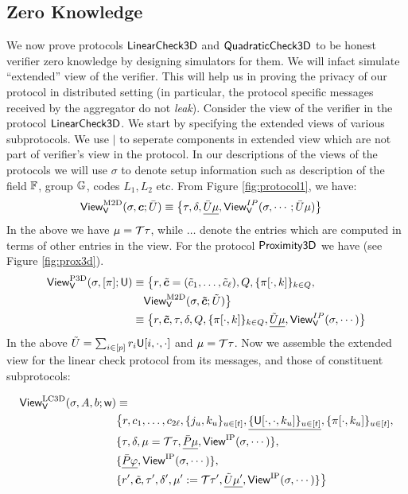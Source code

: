 \subsection{Zero Knowledge}
We now prove protocols $\mathsf{LinearCheck3D}$ and $\mathsf{QuadraticCheck3D}$ to be honest verifier zero knowledge by
designing simulators for them. We will infact simulate ``extended'' view of the
verifier. This will help us in proving the privacy of our protocol in
distributed setting (in particular, the protocol specific messages received by
the aggregator do not {\em leak}). Consider the view of the verifier in the
protocol $\mathsf{LinearCheck3D}$. We start by specifying the extended views of various
subprotocols. We use $\vert$ to seperate components in extended view which are
not part of verifier's view in the protocol. In our descriptions of the views of
the protocols we will use $\sigma$ to denote setup information such as
description of the field $\mathbb{F}$, group $\mathbb{G}$, codes $L_1,L_2$ etc. From Figure
\ref{fig:protocol1}, we have:
\begin{align}
\mathsf{View}^{\rm M2D}_{\mathsf{V}}(\sigma,\bm{c};\bar{U}) &\equiv
	\big\{\tau,\delta,\underline{\bar{U}\mu},\mathsf{View}^{IP}_{\mathsf{V}}(\sigma,\cdots;\bar{U}\mu)\big\}
\end{align}
In the above we have $\mu=\mathcal{T}\tau$, while $\ldots$ denote the entries which are
computed in terms of other entries in the view. For the protocol
$\mathsf{Proximity3D}$ we have (see Figure \ref{fig:prox3d}).
\begin{align}
\mathsf{View}^{\rm P3D}_{\mathsf{V}}(\sigma,[\pi];\mathsf{U})& \equiv
\big\{r,\tilde{\bm{c}}=(\tilde{c}_1,\ldots,\tilde{c}_{\ell}),Q,\{\pi[\cdot,k]\}_{k\in
Q}, \nonumber \\
	&\quad \mathsf{View}^{\rm M2D}_{\mathsf{V}}(\sigma,\bm{\tilde{c}};\tilde{U})\big\}
\nonumber \\
	&\equiv
\big\{r,\bm{\tilde{c}},\tau,\delta,Q,\{\pi[\cdot,k]\}_{k\in Q},\underline{\tilde{U}\mu},\mathsf{View}^{IP}_{\mathsf{V}}(\sigma,\cdots)\big\}
\end{align}
In the above $\tilde{U}=\sum_{i\in [p]}r_i\mathsf{U}[i,\cdot,\cdot]$ and
$\mu=\mathcal{T}\tau$. Now we assemble the extended view for the linear check
protocol from its messages, and those of constituent subprotocols:

\begin{align}
\mathsf{View}^{\rm LC3D}_{\mathsf{V}}(\sigma,A,b;\mathsf{w})&\equiv \nonumber \\
&\big\{r,c_1,\ldots,c_{2\ell},\{j_u,k_u\}_{u\in [t]},
\underline{\{\mathsf{U}[\cdot,\cdot,k_u]\}_{u\in [t]}},\{\pi[\cdot,k_u]\}_{u\in [t]},
\nonumber \\
& \{\tau, \delta, \mu=\mathcal{T}\tau, \underline{\bar{P}\mu}, \mathsf{View}^{\rm
IP}(\sigma,\cdots)\}, \nonumber \\
& \{\underline{\bar{P}\varphi}, \mathsf{View}^{\rm IP}(\sigma,\cdots)\}, \nonumber \\
& \{r',\tilde{\bm{c}},\tau',\delta',\mu':=\mathcal{T}\tau',\underline{\tilde{U}\mu'},
	\mathsf{View}^{\rm IP}(\sigma,\cdots)\}\big\}
\end{align}



